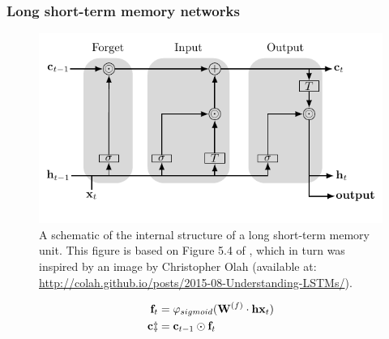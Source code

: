 \documentclass[xcolor={table}]{beamer}
\begin{document}
\subsubsection{Long short-term memory networks}


 \begin{frame} 
\begin{figure}[t]
\centerline{
\includegraphics[width=\textwidth]{./images/fmlpda_8_40.pdf}
}
\caption{A schematic of the internal structure of a long short-term memory unit. This figure is based on Figure 5.4 of \citep{kelleher:2019}, which in turn was inspired by an image by Christopher Olah (available at: \url{http://colah.github.io/posts/2015-08-Understanding-LSTMs/}).}
\label{fig:lstm}
\end{figure}
\end{frame} 



 \begin{frame} 
\begin{alignat}{2}
\mathbf{f}_t &= \varphi_{sigmoid}(\mathbf{W}^{(f)} \cdot \mathbf{hx}_t) \label{eqn:forgetmask}\\
\mathbf{c\ddagger} &= \mathbf{c}_{t-1} \odot \mathbf{f}_t \label{eqn:forgetcellupdated}\\
\notag
\end{alignat}
\end{frame} 
\end{document}
